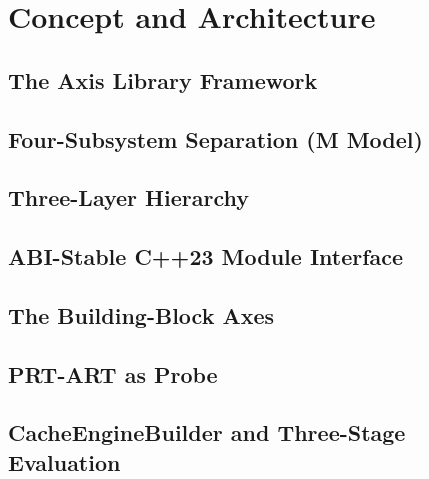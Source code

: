 \chapter{Concept and Architecture}\label{ch:concept}


\section{The Axis Library Framework}\label{sec:axis-framework}

\section{Four-Subsystem Separation (M Model)}\label{sec:m-model}

\section{Three-Layer Hierarchy}\label{sec:three-layer}

\section{ABI-Stable C++23 Module Interface}\label{sec:abi}

\section{The Building-Block Axes}\label{sec:axes}

\section{PRT-ART as Probe}\label{sec:prt-art}

\section{CacheEngineBuilder and Three-Stage Evaluation}\label{sec:builder}
